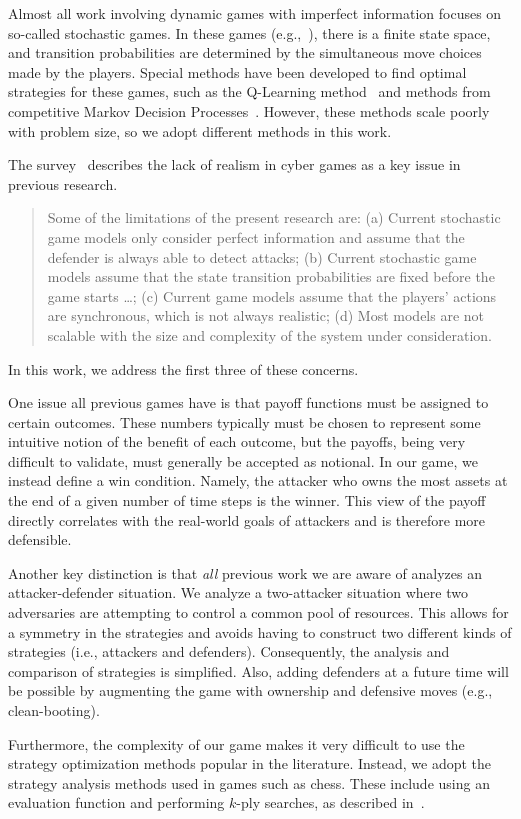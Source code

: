 Almost all work involving dynamic games with imperfect information
focuses on so-called stochastic games. In these games
(e.g.,~\cite{alpcan2006intrusion, lye2005game, nguyen2009stochastic,
  sallhammar2006stochastic, xiaolin2008markov}), there is a finite
state space, and transition probabilities are determined by the
simultaneous move choices made by the players. Special methods have
been developed to find optimal strategies for these games, such as the
Q-Learning method~\cite{hu2003nash} and methods from competitive
Markov Decision Processes~\cite{filar2012competitive}. However, these
methods scale poorly with problem size, so we adopt different methods
in this work.

The survey~\cite{roy2010survey} describes the lack of realism in cyber
games as a key issue in previous research.
\begin{quote}
  Some of the limitations of the present research are: (a) Current
  stochastic game models only consider perfect information and
  assume that the defender is always able to detect attacks; (b)
  Current stochastic game models assume that the state transition
  probabilities are fixed before the game starts \ldots; 
  (c) Current game models assume that the players' actions
  are synchronous, which is not always realistic; (d) Most models are
  not scalable with the size and complexity of the system under
  consideration.
\end{quote}
In this work, we address the first three of these concerns.

One issue all previous games have is that payoff functions must be
assigned to certain outcomes. These numbers typically must be chosen
to represent some intuitive notion of the benefit of each outcome, but
the payoffs, being very difficult to validate, must generally be
accepted as notional. In our game, we instead define a win condition. Namely,
the attacker who owns the most assets at the end of a given number of
time steps is the winner. This view of the payoff directly correlates
with the real-world goals of attackers and is therefore more
defensible.

Another key distinction is that {\em all} previous work we are aware
of analyzes an attacker-defender situation. We analyze a two-attacker
situation where two adversaries are attempting to control a common
pool of resources. This allows for a symmetry in the strategies and
avoids having to construct two different kinds of strategies (i.e.,
attackers and defenders). Consequently, the analysis and comparison of
strategies is simplified. Also, adding defenders at a future time will
be possible by augmenting the game with ownership and defensive moves
(e.g., clean-booting).

Furthermore, the complexity of our game makes it very difficult to use
the strategy optimization methods popular in the literature. Instead,
we adopt the strategy analysis methods used in games such as
chess. These include using an evaluation function and performing
$k$-ply searches, as described in~\cite{levy2009computer,shannon1950programming}.



